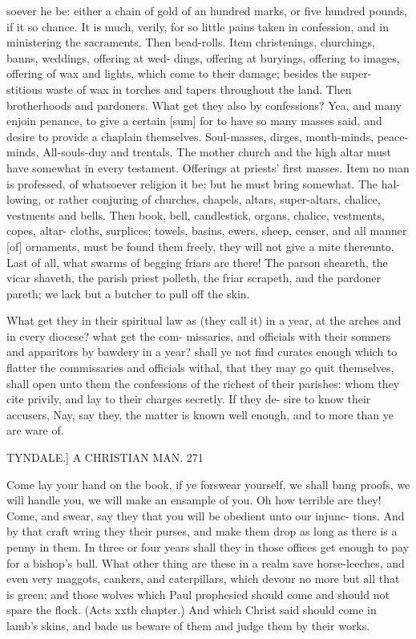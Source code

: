 \documentclass{custom}
\begin{document}
{soever he be: either a chain of gold of an hundred 
marks, or five hundred pounds, if it so chance. It is 
much, verily, for so little pains taken in confession, and 
in ministering the sacraments. Then bead-rolls. Item 
christenings, churchings, banns, weddings, offering at wed- 
dings, offering at buryings, offering to images, offering of wax 
and lights, which come to their damage; besides the super- 
stitious waste of wax in torches and tapers throughout 
the land. Then brotherhoods and pardoners. What get 
they also by confessions? Yea, and many enjoin penance, 
to give a certain [sum] for to have so many masses said, and 
desire to provide a chaplain themselves. Soul-masses, 
dirges, month-minds, peace-minds, All-souls-duy and 
trentals. The mother church and the high altar must 
have somewhat in every testament. Offerings at priests' 
first masses. Item no man is professed, of whatsoever 
religion it be; but he must bring somewhat. The hal- 
lowing, or rather conjuring of churches, chapels, altars, 
super-altars, chalice, vestments and bells. Then book, 
bell, candlestick, organs, chalice, vestments, copes, altar- 
cloths, surplices; towels, basins, ewers, sheep, censer, 
and all manner [of] ornaments, must be found them freely, 
they will not give a mite thereunto. Last of all, what 
swarms of begging friars are there! The parson sheareth, 
the vicar shaveth, the parish priest polleth, the friar 
scrapeth, and the pardoner pareth; we lack but a butcher 
to pull off the skin. 

What get they in their spiritual law as (they call it) in a 
year, at the arches and in every diocese? what get the com- 
missaries, and officials with their somners and apparitors 
by bawdery in a year? shall ye not find curates enough 
which to flatter the commissaries and officials withal, that 
they may go quit themselves, shall open unto them the 
confessions of the richest of their parishes: whom they 
cite privily, and lay to their charges secretly. If they de- 
sire to know their accusers, Nay, say they, the matter is 
known well enough, and to more than ye are ware of. 


TYNDALE.]
A CHRISTIAN MAN.
271

Come lay your hand on the book, if ye forswear yourself,
we shall bnng proofs, we will handle you, we will make
an ensample of you. Oh how terrible are they! Come, and 
swear, say they that you will be obedient unto our injunc- 
tions. And by that craft wring they their purses, and 
make them drop as long as there is a penny in them. In 
three or four years shall they in those offices get enough to 
pay for a bishop's bull. What other thing are these in a 
realm save horse-leeches, and even very maggots, cankers, 
and caterpillars, which devour no more but all that is green; 
and those wolves which Paul prophesied should come and 
should not spare the flock. (Acts xxth chapter.) And 
which Christ said should come in lamb's skins, and bade us 
beware of them and judge them by their works. 

}
\end{document}
